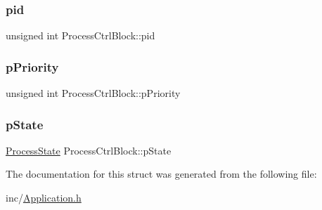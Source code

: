 \hypertarget{struct_process_ctrl_block_ae46902daea4f3e8dfba195e1a783c7bd}{}\label{struct_process_ctrl_block_ae46902daea4f3e8dfba195e1a783c7bd} 
\subsubsection{\texorpdfstring{pid}{pid}}
{\footnotesize\ttfamily unsigned int Process\+Ctrl\+Block\+::pid}

\hypertarget{struct_process_ctrl_block_a39549ff84ceba89d2331e8f9b40b44ea}{}\label{struct_process_ctrl_block_a39549ff84ceba89d2331e8f9b40b44ea} 
\subsubsection{\texorpdfstring{p\+Priority}{pPriority}}
{\footnotesize\ttfamily unsigned int Process\+Ctrl\+Block\+::p\+Priority}

\hypertarget{struct_process_ctrl_block_a760cdacdb53cd9904bcdb4f32e6097b4}{}\label{struct_process_ctrl_block_a760cdacdb53cd9904bcdb4f32e6097b4} 
\subsubsection{\texorpdfstring{p\+State}{pState}}
{\footnotesize\ttfamily \hyperlink{_application_8h_a373a58178f69d5e3e1de7516d105675e}{Process\+State} Process\+Ctrl\+Block\+::p\+State}



The documentation for this struct was generated from the following file\+:\begin{DoxyCompactItemize}
\item 
inc/\hyperlink{_application_8h}{Application.\+h}\end{DoxyCompactItemize}

